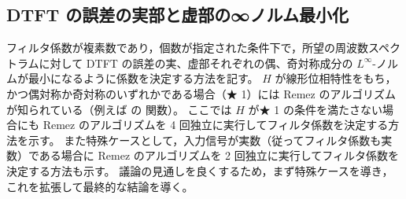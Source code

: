    \subsection{DTFT の誤差の実部と虚部の∞ノルム最小化}
        \newcommand{\Ntp}{N_{\text{tp}}}
        \newcommand{\Hid}{H_{\text{id}}}
        \newcommand{\HidR}{H_{\text{id,r}}}
        \newcommand{\HidI}{H_{\text{id,i}}}
        \newcommand{\HidH}{H_{\text{id,H}}}
        \newcommand{\HidHr}{H_{\text{id,H,r}}}
        \newcommand{\HidHi}{H_{\text{id,H,i}}}
        \newcommand{\HidSH}{H_{\text{id,SH}}}
        \newcommand{\HidSHr}{H_{\text{id,SH,r}}}
        \newcommand{\HidSHi}{H_{\text{id,SH,i}}}
        \newcommand{\hes}{h_{\text{es}}}
        \newcommand{\hos}{h_{\text{os}}}
        \newcommand{\Hes}{H_{\text{es}}}
        \newcommand{\Hos}{H_{\text{os}}}
        \newcommand{\hr}{h_{\text{r}}}
        \newcommand{\hi}{h_{\text{i}}}
        \newcommand{\hrEs}{h_{\text{r,es}}}
        \newcommand{\hrOs}{h_{\text{r,os}}}
        \newcommand{\hiEs}{h_{\text{i,es}}}
        \newcommand{\hiOs}{h_{\text{i,os}}}
        \newcommand{\hesOpt}{h_{\text{es,opt}}}
        \newcommand{\hosOpt}{h_{\text{os,opt}}}
        \newcommand{\hopt}{h_{\text{opt}}}
        \newcommand{\hrEsOpt}{h_{\text{r,es,opt}}}
        \newcommand{\hrOsOpt}{h_{\text{r,os,opt}}}
        \newcommand{\hiEsOpt}{h_{\text{i,es,opt}}}
        \newcommand{\hiOsOpt}{h_{\text{i,os,opt}}}
        \newcommand{\HesOpt}{H_{\text{es,opt}}}
        \newcommand{\HosOpt}{H_{\text{os,opt}}}
        \newcommand{\Hopt}{H_{\text{opt}}}
        \newcommand{\HrEsOpt}{H_{\text{r,es,opt}}}
        \newcommand{\HrOsOpt}{H_{\text{r,os,opt}}}
        \newcommand{\HiEsOpt}{H_{\text{i,es,opt}}}
        \newcommand{\HiOsOpt}{H_{\text{i,os,opt}}}
        \newcommand{\eEs}{\mathrm{e}_{\text{es}}}
        \newcommand{\eOs}{\mathrm{e}_{\text{os}}}
        \newcommand{\eOpt}{\mathrm{e}_{\text{opt}}}
        \newcommand{\erEs}{\mathrm{e}_{\text{r,es}}}
        \newcommand{\erOs}{\mathrm{e}_{\text{r,os}}}
        \newcommand{\eiEs}{\mathrm{e}_{\text{i,es}}}
        \newcommand{\eiOs}{\mathrm{e}_{\text{i,os}}}
        フィルタ係数が複素数であり，個数が指定された条件下で，所望の周波数スペクトラムに対して DTFT の誤差の実、虚部それぞれの偶、奇対称成分の $L^\infty$-ノルムが最小になるように係数を決定する方法を記す。
        $H$ が線形位相特性をもち，かつ偶対称か奇対称のいずれかである場合（★ 1）には Remez のアルゴリズムが知られている（例えば \cite{DSP_JL} の  関数）。
        ここでは $H$ が★ 1 の条件を満たさない場合にも Remez のアルゴリズムを 4 回独立に実行してフィルタ係数を決定する方法を示す。
        また特殊ケースとして，入力信号が実数（従ってフィルタ係数も実数）である場合に Remez のアルゴリズムを 2 回独立に実行してフィルタ係数を決定する方法も示す。
        議論の見通しを良くするため，まず特殊ケースを導き，これを拡張して最終的な結論を導く。
